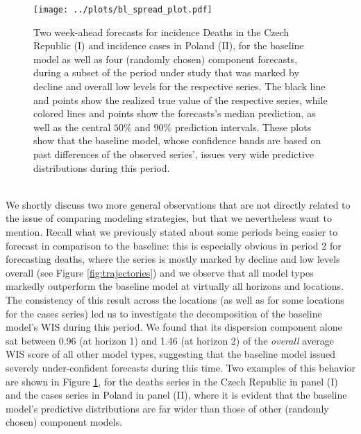 \begin{figure}
\centering
\texttt{[image: ../plots/bl\_spread\_plot.pdf]}
\caption{Two week-ahead forecasts for incidence Deaths in the Czech Republic (I) and incidence cases in Poland (II), for the baseline model as well as four (randomly chosen) component forecasts, during a subset of the period under study that was marked by decline and overall low levels for the respective series. The black line and points show the realized true value of the respective series, while colored lines and points show the forecasts's median prediction, as well as the central $50\%$ and $90\%$ prediction intervals. These plots show that the baseline model, whose confidence bands are based on past differences of the observed series', issues very wide predictive distributions during this period.}
\label{fig:blspread}
\end{figure}\medskip\\ 
We shortly discuss two more general observations that are not directly related to the issue of comparing modeling strategies, but that we nevertheless want to mention. Recall what we previously stated about some periods being easier to forecast in comparison to the baseline: this is especially obvious in period 2 for forecasting deaths, where the series is mostly marked by decline and low levels overall (see Figure \ref{fig:trajectories}) and we observe that all model types markedly outperform the baseline model at virtually all horizons and locations. The consistency of this result across the locations (as well as for some locations for the cases series) led us to investigate the decomposition of the baseline model's WIS during this period. We found that its dispersion component alone sat between 0.96 (at horizon 1) and 1.46 (at horizon 2) of the \textit{overall} average WIS score of all other model types, suggesting that the baseline model issued severely under-confident forecasts during this time. Two examples of this behavior are shown in Figure \ref{fig:blspread}, for the deaths series in the Czech Republic in panel (I) and the cases series in Poland in panel (II), where it is evident that the baseline model's predictive distributions are far wider than those of other (randomly chosen) component models.  %
